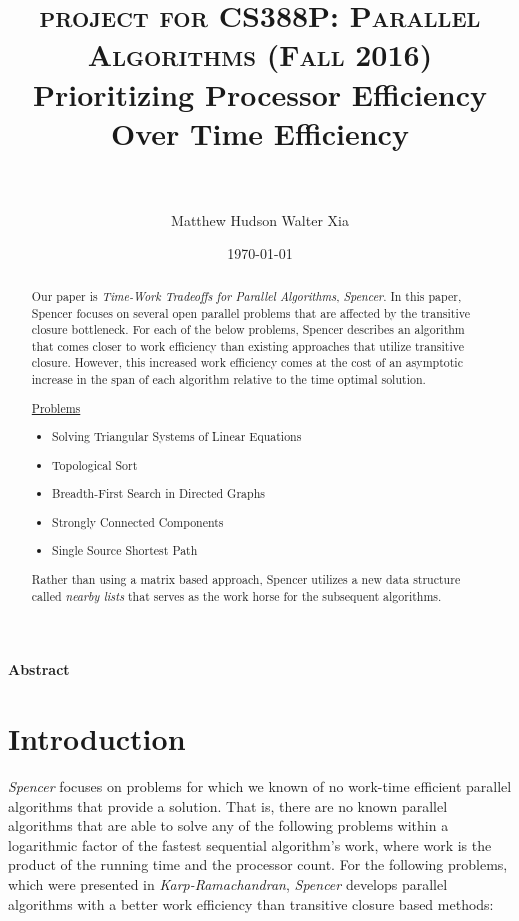 \documentclass[paper=a4, fontsize=11pt]{scrartcl} %
\title{	
\normalfont \normalsize 
\textsc{project for CS388P: Parallel Algorithms (Fall 2016)} 
\horrule{0.5pt} \\[0.4cm] %
\huge Prioritizing Processor Efficiency Over Time Efficiency \\ %
\horrule{2pt} \\[0.5cm] %
}
\author{Matthew Hudson \hspace{5mm} Walter Xia }	%
\date{\normalsize\today} %
\numberwithin{equation}{section} %
\numberwithin{figure}{section} %
\numberwithin{table}{section} %
\begin{document}
\maketitle %

\justify
\textbf{Abstract}

\begin{abstract}
Our paper is \textit{Time-Work Tradeoffs for Parallel Algorithms}, \textit{Spencer\cite{S97}}. In this paper, Spencer focuses on several open parallel problems that are affected by the transitive closure bottleneck. For each of the below problems, Spencer describes an algorithm that comes closer to work efficiency than existing approaches that utilize transitive closure. However, this increased work efficiency comes at the cost of an asymptotic increase in the span of each algorithm relative to the time optimal solution.  

\underline{Problems}
\begin{itemize}
\item Solving Triangular Systems of Linear Equations
\item Topological Sort
\item Breadth-First Search in Directed Graphs
\item Strongly Connected Components
\item Single Source Shortest Path
\end{itemize}

Rather than using a matrix based approach, Spencer utilizes a new data structure called \textit{nearby lists} that serves as the work horse for the subsequent algorithms. \\
\end{abstract}


\section{Introduction}

\textit{Spencer\cite{S97}} focuses on problems for which we known of no work-time efficient parallel algorithms that provide a solution. That is, there are no known parallel algorithms that are able to solve any of the following problems within a logarithmic factor of the fastest sequential algorithm's work, where work is the product of the running time and the processor count. For the following problems, which were presented in \textit{Karp-Ramachandran\cite{KR90}}, \textit{Spencer\cite{S97}} develops parallel algorithms with a better work efficiency than transitive closure based methods:
\end{document}
